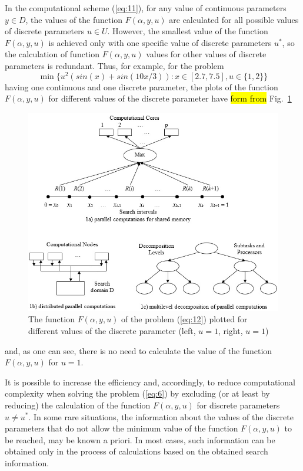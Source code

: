 \documentclass{svproc}
\begin{document}
In the computational scheme (\ref{eq:11}), for any value of continuous parameters $y \in D$, the values of the function $F(\alpha,y,u)$ are calculated for all possible values of discrete parameters $u \in U$. However, the smallest value of the function $F(\alpha,y,u)$ is achieved only with one specific value of discrete parameters $u^*$, so the calculation of function $F(\alpha,y,u)$ values for other values of discrete parameters is redundant. Thus, for example, for the problem
\begin{equation}\label{eq:12}
 \min\{u^2(sin(x)+sin(10x/3)):x\in[2.7,7.5],u\in \{1,2\}\}
\end{equation}
having one continuous and one discrete parameter, the plots of the  function $F(\alpha,y,u)$ for different values of the discrete parameter have \hl{form from }Fig.~\ref{fig:1} 
\begin{figure}
  \centering
  \includegraphics[width=0.9\linewidth]{fig1}
  \caption{The function $F(\alpha,y,u)$ of the problem (\ref{eq:12}) plotted for different values of the discrete parameter (left, $u=1$,  right, $u=1$)}
  \label{fig:1}
\end{figure}
and, as one can see, there is no need to calculate the value of the function $F(\alpha,y,u)$ for $u=1$.

It is possible to increase the efficiency and, accordingly, to reduce computational complexity when solving  the problem (\ref{eq:6}) by excluding (or at least by reducing) the calculation of the function $F(\alpha,y,u)$ for discrete parameters $u \neq u^*$. In some rare situations, the information about the values of the discrete parameters that do not allow the minimum value of the function $F(\alpha,y,u)$ to be reached, may be known a priori. In most cases, such information can be obtained only in the process of calculations based on the obtained search information. 
\end{document}
